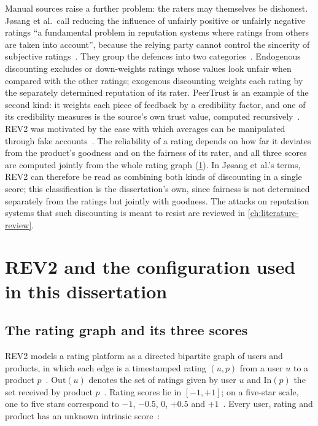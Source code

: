 Manual sources raise a further problem: the raters may themselves be dishonest. Jøsang et al.\ call reducing the influence of unfairly positive or unfairly negative ratings \enquote{a fundamental problem in reputation systems where ratings from others are taken into account}, because the relying party cannot control the sincerity of subjective ratings~\cite[p.~638]{Jsang2007}. They group the defences into two categories~\cite[p.~638]{Jsang2007}. Endogenous discounting excludes or down-weights ratings whose values look unfair when compared with the other ratings; exogenous discounting weights each rating by the separately determined reputation of its rater. PeerTrust is an example of the second kind: it weights each piece of feedback by a credibility factor, and one of its credibility measures is the source's own trust value, computed recursively~\cite[p.~846]{LiXiong2004}. REV2 was motivated by the ease with which averages can be manipulated through fake accounts~\cite[p.~335]{Kumar2018}. The reliability of a rating depends on how far it deviates from the product's goodness and on the fairness of its rater, and all three scores are computed jointly from the whole rating graph (\cref{sec:rev2}). In Jøsang et al.'s terms, REV2 can therefore be read as combining both kinds of discounting in a single score; this classification is the dissertation's own, since fairness is not determined separately from the ratings but jointly with goodness. The attacks on reputation systems that such discounting is meant to resist are reviewed in \cref{ch:literature-review}.

\section{REV2 and the configuration used in this dissertation}\label{sec:rev2}

\subsection{The rating graph and its three scores}\label{sec:rev2-graph}

REV2 models a rating platform as a directed bipartite graph of users and products, in which each edge is a timestamped rating $(u, p)$ from a user $u$ to a product $p$~\cite[p.~333]{Kumar2018}. $\mathrm{Out}(u)$ denotes the set of ratings given by user $u$ and $\mathrm{In}(p)$ the set received by product $p$~\cite[p.~335]{Kumar2018}. Rating scores lie in $[-1, +1]$; on a five-star scale, one to five stars correspond to $-1$, $-0.5$, $0$, $+0.5$ and $+1$~\cite[p.~336]{Kumar2018}. Every user, rating and product has an unknown intrinsic score~\cite[p.~335]{Kumar2018}:

